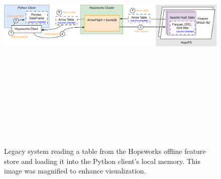 \begin{figure}
    \begin{center}
      \includegraphics[angle=90,origin=c,keepaspectratio,height=12.5cm]{figures/2-background_and_related_work/hudi_read.png}
    \end{center}
    \caption[Legacy system - Read process - Magnified diagram]{Legacy system reading a table from the Hopsworks offline feature store and loading it into the Python client's local memory. This image was magnified to enhance visualization.}
    \label{fig:appx_hudi_reading_schema}
\end{figure}